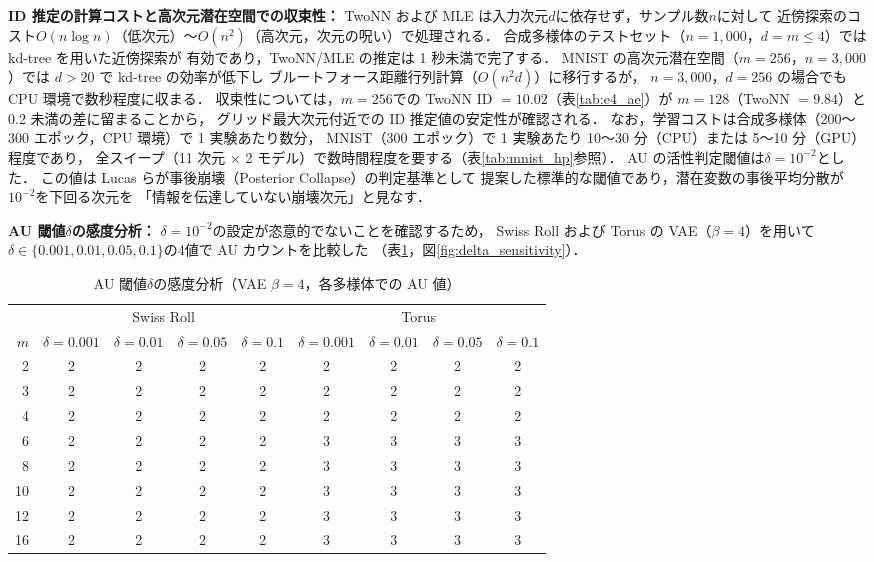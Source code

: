 \documentclass[12pt,a4paper]{jsarticle}
\begin{document}
\textbf{ID 推定の計算コストと高次元潜在空間での収束性：}
TwoNN および MLE は入力次元$d$に依存せず，サンプル数$n$に対して
近傍探索のコスト$O(n \log n)$（低次元）〜$O(n^2)$（高次元，次元の呪い）で処理される．
合成多様体のテストセット（$n = 1{,}000$，$d = m \leq 4$）では kd-tree を用いた近傍探索が
有効であり，TwoNN/MLE の推定は 1 秒未満で完了する．
MNIST の高次元潜在空間（$m = 256$，$n = 3{,}000$）では $d > 20$ で kd-tree の効率が低下し
ブルートフォース距離行列計算（$O(n^2 d)$）に移行するが，
$n = 3{,}000$，$d = 256$ の場合でも CPU 環境で数秒程度に収まる．
収束性については，$m = 256$での TwoNN ID $= 10.02$（表\ref{tab:e4_ae}）が
$m = 128$（TwoNN $= 9.84$）と 0.2 未満の差に留まることから，
グリッド最大次元付近での ID 推定値の安定性が確認される．
なお，学習コストは合成多様体（200〜300 エポック，CPU 環境）で 1 実験あたり数分，
MNIST（300 エポック）で 1 実験あたり 10〜30 分（CPU）または 5〜10 分（GPU）程度であり，
全スイープ（11 次元 $\times$ 2 モデル）で数時間程度を要する（表\ref{tab:mnist_hp}参照）．
AU の活性判定閾値は$\delta = 10^{-2}$とした\cite{lucas2019elbo}．
この値は Lucas ら\cite{lucas2019elbo}が事後崩壊（Posterior Collapse）の判定基準として
提案した標準的な閾値であり，潜在変数の事後平均分散が$10^{-2}$を下回る次元を
「情報を伝達していない崩壊次元」と見なす．

\textbf{AU 閾値$\delta$の感度分析：}
$\delta = 10^{-2}$の設定が恣意的でないことを確認するため，
Swiss Roll および Torus の VAE（$\beta = 4$）を用いて
$\delta \in \{0.001, 0.01, 0.05, 0.1\}$の4値で AU カウントを比較した
（表\ref{tab:delta_sensitivity}，図\ref{fig:delta_sensitivity}）．

\begin{table}[H]
\centering
\caption{AU 閾値$\delta$の感度分析（VAE $\beta=4$，各多様体での AU 値）}
\label{tab:delta_sensitivity}
\begin{tabular}{rcccc|cccc}
\toprule
 & \multicolumn{4}{c|}{Swiss Roll} & \multicolumn{4}{c}{Torus} \\
$m$ & $\delta=0.001$ & $\delta=0.01$ & $\delta=0.05$ & $\delta=0.1$
    & $\delta=0.001$ & $\delta=0.01$ & $\delta=0.05$ & $\delta=0.1$ \\
\midrule
2  & 2 & 2 & 2 & 2 & 2 & 2 & 2 & 2 \\
3  & 2 & 2 & 2 & 2 & 2 & 2 & 2 & 2 \\
4  & 2 & 2 & 2 & 2 & 2 & 2 & 2 & 2 \\
6  & 2 & 2 & 2 & 2 & 3 & 3 & 3 & 3 \\
8  & 2 & 2 & 2 & 2 & 3 & 3 & 3 & 3 \\
10 & 2 & 2 & 2 & 2 & 3 & 3 & 3 & 3 \\
12 & 2 & 2 & 2 & 2 & 3 & 3 & 3 & 3 \\
16 & 2 & 2 & 2 & 2 & 3 & 3 & 3 & 3 \\
\bottomrule
\end{tabular}
\end{table}
\end{document}

